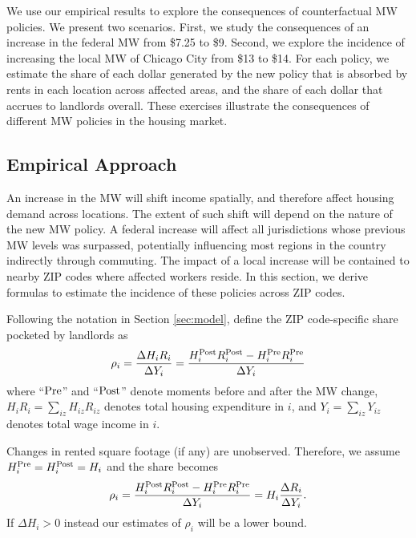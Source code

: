 
We use our empirical results to explore the consequences of counterfactual 
MW policies.
We present two scenarios.
First, we study the consequences of an increase in the federal MW 
from \$7.25 to \$9.
Second, we explore the incidence of increasing the local MW of Chicago City 
from \$13 to \$14.
For each policy, we estimate the share of each dollar generated by the new 
policy that is absorbed by rents in each location across affected areas, and 
the share of each dollar that accrues to landlords overall.
These exercises illustrate the consequences of different MW policies in the 
housing market.

\subsection{Empirical Approach}\label{sec:emp_cf}

An increase in the MW will shift income spatially, and therefore affect housing 
demand across locations.
The extent of such shift will depend on the nature of the new MW policy.
A federal increase will affect all jurisdictions whose previous MW levels was 
surpassed, potentially influencing most regions in the country indirectly 
through commuting.
The impact of a local increase will be contained to nearby ZIP codes where 
affected workers reside.
In this section, we derive formulas to estimate the incidence of these 
policies across ZIP codes.

Following the notation in Section \ref{sec:model}, define the ZIP code-specific 
share pocketed by landlords as
\begin{equation*}
    \rho_i = \frac{\Delta H_i R_i}{\Delta Y_i} 
           = \frac{H^{\text{Post}}_i R^{\text{Post}}_i - H^{\text{Pre}}_i R^{\text{Pre}}_i}{\Delta Y_i} 
\end{equation*}
where
``$\text{Pre}$'' and ``$\text{Post}$'' denote moments before and after the MW change,
$H_i R_i = \sum_{iz} H_{iz} R_{iz}$ denotes total housing expenditure in $i$, and
$Y_i = \sum_{iz} Y_{iz}$ denotes total wage income in $i$.

Changes in rented square footage (if any) are unobserved.
Therefore, we assume $H^{\text{Pre}}_i = H^{\text{Post}}_i = H_i$ and the share becomes
\begin{equation}\label{eq:share_pocketed}
    \rho_i = \frac{H^{\text{Post}}_i R^{\text{Post}}_i - H^{\text{Pre}}_i R^{\text{Pre}}_i}{\Delta Y_i} = 
                H_i \frac{\Delta R_i}{\Delta Y_i} .
\end{equation}
If $\Delta H_i > 0$ instead our estimates of $\rho_i$ will be a lower bound.

